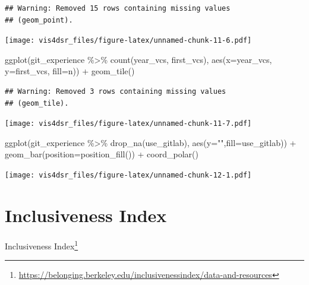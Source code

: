 \documentclass[
]{krantz}
\makeatletter
\newenvironment{Shaded}{\begin{snugshade}}{\end{snugshade}}
\newcommand{\AttributeTok}[1]{\textcolor[rgb]{0.61,0.61,0.61}{#1}}
\newcommand{\FunctionTok}[1]{\textcolor[rgb]{0,0,0}{#1}}
\newcommand{\NormalTok}[1]{#1}
\newcommand{\SpecialCharTok}[1]{\textcolor[rgb]{0,0,0}{#1}}
\newcommand{\StringTok}[1]{\textcolor[rgb]{0.5,0.5,0.5}{#1}}
\renewcommand{\href}[2]{#2\footnote{\url{#1}}}
\newenvironment{kframe}{%
\medskip{}
\setlength{\fboxsep}{.8em}
 \def\at@end@of@kframe{}%
 \ifinner\ifhmode%
  \def\at@end@of@kframe{\end{minipage}}%
  \begin{minipage}{\columnwidth}%
 \fi\fi%
 \def\FrameCommand##1{\hskip\@totalleftmargin \hskip-\fboxsep
 \colorbox{shadecolor}{##1}\hskip-\fboxsep
     \hskip-\linewidth \hskip-\@totalleftmargin \hskip\columnwidth}%
 \MakeFramed {\advance\hsize-\width
   \@totalleftmargin\z@ \linewidth\hsize
   \@setminipage}}%
 {\par\unskip\endMakeFramed%
 \at@end@of@kframe}
\renewenvironment{Shaded}{\begin{kframe}}{\end{kframe}}
\makeatother
\begin{document}
\begin{verbatim}
## Warning: Removed 15 rows containing missing values
## (geom_point).
\end{verbatim}

\texttt{[image: vis4dsr\_files/figure-latex/unnamed-chunk-11-6.pdf]}

\begin{Shaded}
\begin{Highlighting}[]
\FunctionTok{ggplot}\NormalTok{(git\_experience }\SpecialCharTok{\%\textgreater{}\%} \FunctionTok{count}\NormalTok{(year\_vcs, first\_vcs), }
       \FunctionTok{aes}\NormalTok{(}\AttributeTok{x=}\NormalTok{year\_vcs, }\AttributeTok{y=}\NormalTok{first\_vcs, }\AttributeTok{fill=}\NormalTok{n)) }\SpecialCharTok{+}
  \FunctionTok{geom\_tile}\NormalTok{()}
\end{Highlighting}
\end{Shaded}

\begin{verbatim}
## Warning: Removed 3 rows containing missing values
## (geom_tile).
\end{verbatim}

\texttt{[image: vis4dsr\_files/figure-latex/unnamed-chunk-11-7.pdf]}

\begin{Shaded}
\begin{Highlighting}[]
\FunctionTok{ggplot}\NormalTok{(git\_experience }\SpecialCharTok{\%\textgreater{}\%} \FunctionTok{drop\_na}\NormalTok{(use\_gitlab), }\FunctionTok{aes}\NormalTok{(}\AttributeTok{y=}\StringTok{""}\NormalTok{,}\AttributeTok{fill=}\NormalTok{use\_gitlab)) }\SpecialCharTok{+}
  \FunctionTok{geom\_bar}\NormalTok{(}\AttributeTok{position=}\FunctionTok{position\_fill}\NormalTok{()) }\SpecialCharTok{+}
  \FunctionTok{coord\_polar}\NormalTok{()}
\end{Highlighting}
\end{Shaded}

\texttt{[image: vis4dsr\_files/figure-latex/unnamed-chunk-12-1.pdf]}

\hypertarget{inclusiveness-index}{%
\section*{Inclusiveness Index}\label{inclusiveness-index}}


\href{https://belonging.berkeley.edu/inclusivenessindex/data-and-resources}{Inclusiveness Index}
\end{document}

